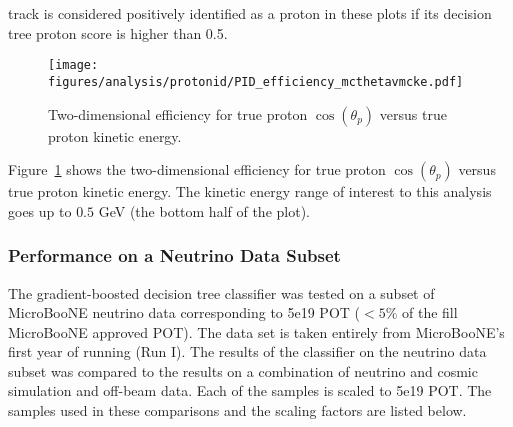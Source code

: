     track is considered positively identified as a proton in these plots if its
    decision tree proton score is higher than 0.5.
    \begin{figure}[ht]
      \centering
      \texttt{[image: figures/analysis/protonid/PID\_efficiency\_mcthetavmcke.pdf]}
      \caption{Two-dimensional efficiency for true proton $\cos(\theta_p)$
      versus true proton kinetic energy.}
      \label{fig:pideffthetake}
    \end{figure}
    Figure~\ref{fig:pideffthetake} shows the two-dimensional efficiency for
    true proton $\cos(\theta_p)$ versus true proton kinetic energy. The kinetic
    energy range of interest to this analysis goes up to $0.5$ GeV (the bottom
    half of the plot).

  \subsubsection{Performance on a Neutrino Data Subset}\label{sec:datamcpid}
    The gradient-boosted decision tree classifier was tested on a subset of
    MicroBooNE neutrino data corresponding to 5e19 POT ($< 5\%$ of the fill
    MicroBooNE approved POT). The data set is taken entirely from MicroBooNE's
    first year of running (Run I). The results of the classifier on the
    neutrino data subset was compared to the results on a combination of
    neutrino and cosmic simulation and off-beam data. Each of the samples is
    scaled to 5e19 POT. The samples used in these comparisons and the scaling
    factors are listed below. 

